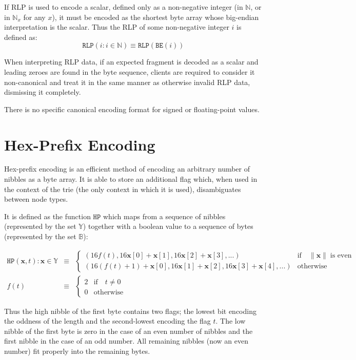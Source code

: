 \documentclass[9pt,oneside]{amsart}
\begin{document}
If RLP is used to encode a scalar, defined only as a non-negative integer (in $\mathbb{N}$, or in $\mathbb{N}_x$ for any $x$), it must be encoded as the shortest byte array whose big-endian interpretation is the scalar. Thus the RLP of some non-negative integer $i$ is defined as:
\begin{equation}
\mathtt{RLP}(i : i \in \mathbb{N}) \equiv \mathtt{RLP}(\mathtt{BE}(i))
\end{equation}

When interpreting RLP data, if an expected fragment is decoded as a scalar and leading zeroes are found in the byte sequence, clients are required to consider it non-canonical and treat it in the same manner as otherwise invalid RLP data, dismissing it completely.

There is no specific canonical encoding format for signed or floating-point values.

\section{Hex-Prefix Encoding}\label{app:hexprefix}
Hex-prefix encoding is an efficient method of encoding an arbitrary number of nibbles as a byte array. It is able to store an additional flag which, when used in the context of the trie (the only context in which it is used), disambiguates between node types.

It is defined as the function $\mathtt{HP}$ which maps from a sequence of nibbles (represented by the set $\mathbb{Y}$) together with a boolean value to a sequence of bytes (represented by the set $\mathbb{B}$):

\begin{eqnarray}
\mathtt{HP}(\mathbf{x}, t): \mathbf{x} \in \mathbb{Y} & \equiv & \begin{cases}
(16f(t), 16\mathbf{x}[0] + \mathbf{x}[1], 16\mathbf{x}[2] + \mathbf{x}[3], ...) &
\text{if} \quad \lVert \mathbf{x} \rVert \; \text{is even} \\
(16(f(t) + 1) + \mathbf{x}[0], 16\mathbf{x}[1] + \mathbf{x}[2], 16\mathbf{x}[3] + \mathbf{x}[4], ...) &
\text{otherwise}
\end{cases} \\
f(t) & \equiv & \begin{cases} 2 & \text{if} \quad t \neq 0 \\ 0 & \text{otherwise} \end{cases}
\end{eqnarray}

Thus the high nibble of the first byte contains two flags; the lowest bit encoding the oddness of the length and the second-lowest encoding the flag $t$. The low nibble of the first byte is zero in the case of an even number of nibbles and the first nibble in the case of an odd number. All remaining nibbles (now an even number) fit properly into the remaining bytes.
\end{document}
